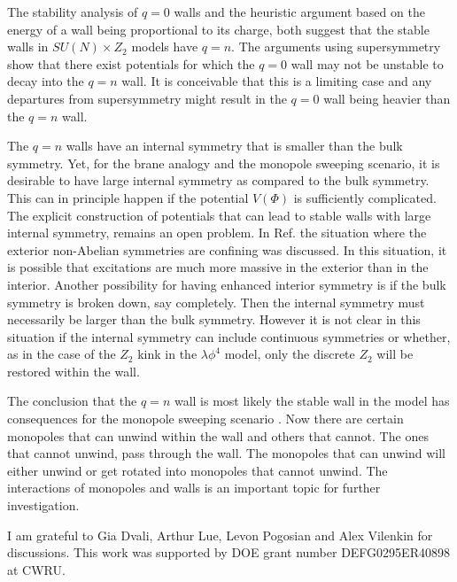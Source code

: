 \documentclass[a4paper,prd,nofootinbib,twocolumn,showpacs]{revtex4}
\begin{document}
The stability analysis of $q=0$ walls and the heuristic
argument based on the energy of a wall being proportional
to its charge, both suggest that the stable walls in
$SU(N)\times Z_2$ models have $q=n$. The arguments using
supersymmetry show that there exist potentials for which
the $q=0$ wall may not be unstable to decay into the $q=n$
wall. It is conceivable that this is a limiting case and any 
departures from supersymmetry might result in the $q=0$ wall 
being heavier than the $q=n$ wall.

The $q=n$ walls have an internal symmetry that is smaller than 
the bulk symmetry. Yet, for the brane analogy and the monopole 
sweeping scenario, it is desirable to have large internal symmetry 
as compared to the bulk symmetry. This can in principle happen if 
the potential $V(\Phi )$ is sufficiently complicated. The explicit 
construction of potentials that can lead to stable walls with 
large internal symmetry, remains an open problem. In Ref.
\cite{DvaShi97,DvaVil02} the situation where the exterior
non-Abelian symmetries are confining was discussed. In this situation, 
it is possible that excitations are much more massive in 
the exterior than in the interior. Another possibility for having 
enhanced interior symmetry is if the bulk symmetry is broken down, 
say completely. Then the internal symmetry must necessarily be larger 
than the bulk symmetry. However it is not clear in this situation 
if the internal symmetry can include continuous symmetries or whether, 
as in the case of the $Z_2$ kink in the $\lambda \phi^4$ model, only 
the discrete $Z_2$ will be restored within the wall. 

The conclusion that the $q=n$ wall is most likely the stable
wall in the model has consequences for the monopole sweeping
scenario \cite{PogVac00b}. Now there are certain monopoles that
can unwind within the wall and others that cannot. The ones
that cannot unwind, pass through the wall. The monopoles that
can unwind will either unwind or get rotated into monopoles
that cannot unwind. The interactions of monopoles and walls
is an important topic for further investigation.

\begin{acknowledgments} 
I am grateful to Gia Dvali, Arthur Lue, Levon Pogosian and 
Alex Vilenkin for discussions.
This work was supported by DOE grant number DEFG0295ER40898 
at CWRU.

\end{acknowledgments}
\end{document}
